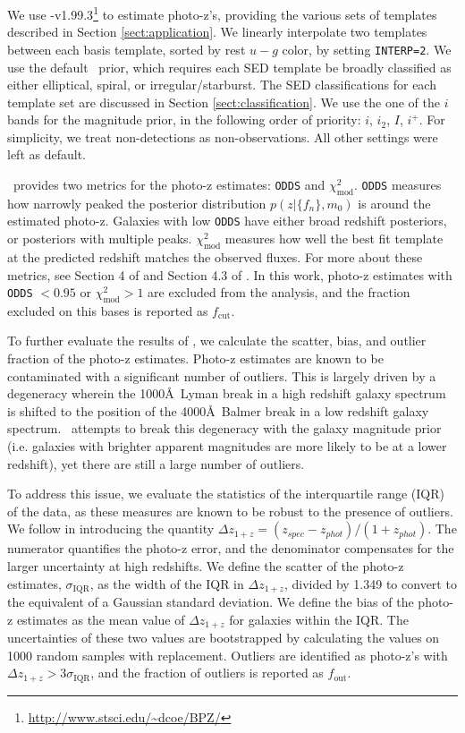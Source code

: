We use \bpz-v1.99.3\footnote{\url{http://www.stsci.edu/~dcoe/BPZ/}} \citep{Benitez2000a} to estimate photo-z's, providing the various sets of templates described in Section \ref{sect:application}.
We linearly interpolate two templates between each basis template, sorted by rest $u-g$ color, by setting \texttt{INTERP=2}. 
We use the default \bpz\ prior, which requires each SED template be broadly classified as either elliptical, spiral, or irregular/starburst. 
The SED classifications for each template set are discussed in Section \ref{sect:classification}. 
We use the one of the $i$ bands for the magnitude prior, in the following order of priority: $i$, $i_2$, $I$, $i^+$.
For simplicity, we treat non-detections as non-observations.
All other settings were left as default.

\bpz\ provides two metrics for the photo-z estimates: \texttt{ODDS} and $\chi_{\text{mod}}^2$.
\texttt{ODDS} measures how narrowly peaked the posterior distribution $p(z|\{f_n\},m_0)$ is around the estimated photo-z.
Galaxies with low \texttt{ODDS} have either broad redshift posteriors, or posteriors with multiple peaks.
$\chi_{\text{mod}}^2$ measures how well the best fit template at the predicted redshift matches the observed fluxes. 
For more about these metrics, see Section 4 of \citet{Benitez2000a} and Section 4.3 of \citet{Coe2006a}.
In this work, photo-z estimates with \texttt{ODDS} $< 0.95$ or $\chi_{\text{mod}}^2 > 1$ are excluded from the analysis, and the fraction excluded on this bases is reported as $f_\text{cut}$.

To further evaluate the results of \bpz, we calculate the scatter, bias, and outlier fraction of the photo-z estimates. 
Photo-z estimates are known to be contaminated with a significant number of outliers.
This is largely driven by a degeneracy wherein the 1000\AA\ Lyman break in a high redshift galaxy spectrum is shifted to the position of the 4000\AA\ Balmer break in a low redshift galaxy spectrum. 
\bpz\ attempts to break this degeneracy with the galaxy magnitude prior (i.e. galaxies with brighter apparent magnitudes are more likely to be at a lower redshift), yet there are still a large number of outliers.

To address this issue, we evaluate the statistics of the interquartile range (IQR) of the data, as these measures are known to be robust to the presence of outliers.
We follow \citet{Graham2018a} in introducing the quantity $\Delta z_{1+z} = (z_{spec} - z_{phot})/(1 + z_{phot})$.
The numerator quantifies the photo-z error, and the denominator compensates for the larger uncertainty at high redshifts. 
We define the scatter of the photo-z estimates, $\sigma_\text{IQR}$,  as the width of the IQR in $\Delta z_{1+z}$, divided by 1.349 to convert to the equivalent of a Gaussian standard deviation. 
We define the bias of the photo-z estimates as the mean value of $\Delta z_{1+z}$ for galaxies within the IQR.
The uncertainties of these two values are bootstrapped by calculating the values on 1000 random samples with replacement. 
Outliers are identified as photo-z's with $\Delta z_{1+z} > 3 \sigma_{\text{IQR}}$, and the fraction of outliers is reported as $f_\text{out}$.



